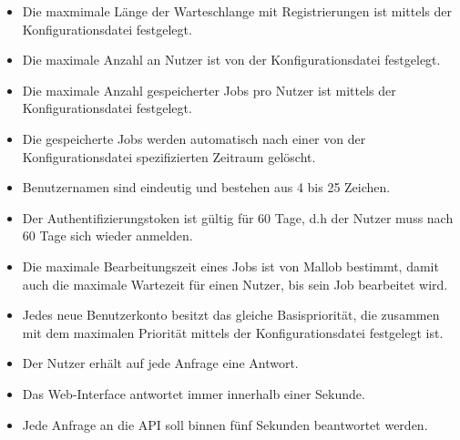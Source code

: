 \begin{itemize}
    \item Die maxmimale Länge der Warteschlange mit Registrierungen ist mittels der Konfigurationsdatei festgelegt.
    \item Die maximale Anzahl an Nutzer ist von der Konfigurationsdatei festgelegt. %
    \item Die maximale Anzahl gespeicherter Jobs pro Nutzer ist mittels der Konfigurationsdatei festgelegt. 
    \item Die gespeicherte Jobs werden automatisch nach einer von der Konfigurationsdatei spezifizierten Zeitraum gelöscht.
    \item Benutzernamen sind eindeutig und bestehen aus 4 bis 25 Zeichen.
    \item Der Authentifizierungstoken ist gültig für 60 Tage, d.h der Nutzer muss nach 60 Tage sich wieder anmelden. %
    \item Die maximale Bearbeitungszeit eines Jobs ist von Mallob bestimmt, damit auch die maximale Wartezeit für einen Nutzer, bis sein Job bearbeitet wird.
    \item Jedes neue Benutzerkonto besitzt das gleiche Basispriorität, die zusammen mit dem maximalen Priorität mittels der Konfigurationsdatei festgelegt ist.
    \item Der Nutzer erhält auf jede Anfrage eine Antwort.
    \item Das Web-Interface antwortet immer innerhalb einer Sekunde. %
    \item Jede Anfrage an die API soll binnen fünf Sekunden beantwortet werden.
    
\end{itemize}
